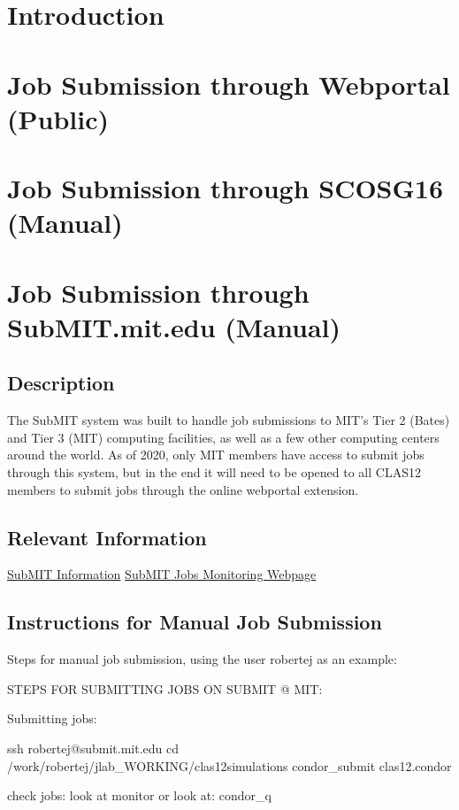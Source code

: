 \section{Introduction}
\section{Job Submission through Webportal (Public)}
\section{Job Submission through SCOSG16 (Manual)}
\section{Job Submission through SubMIT.mit.edu (Manual)}
\subsection{Description}
The SubMIT system was built to handle job submissions to MIT's Tier 2 (Bates) and Tier 3 (MIT) computing facilities, as well as a few other computing centers around the world. As of 2020, only MIT members have access to submit jobs through this system, but in the end it will need to be opened to all CLAS12 members to submit jobs through the online webportal extension. 
\subsection{Relevant Information}
\href{http://submit.mit.edu/}{SubMIT Information}
\href{http://submit.mit.edu/condormon/index.php}{SubMIT Jobs Monitoring Webpage}
\subsection{Instructions for Manual Job Submission}
Steps for manual job submission, using the user robertej as an example:

STEPS FOR SUBMITTING JOBS ON SUBMIT @ MIT:


Submitting jobs:

ssh robertej@submit.mit.edu
cd /work/robertej/jlab_WORKING/clas12simulations
condor_submit clas12.condor

check jobs: look at monitor or look at:
condor_q
